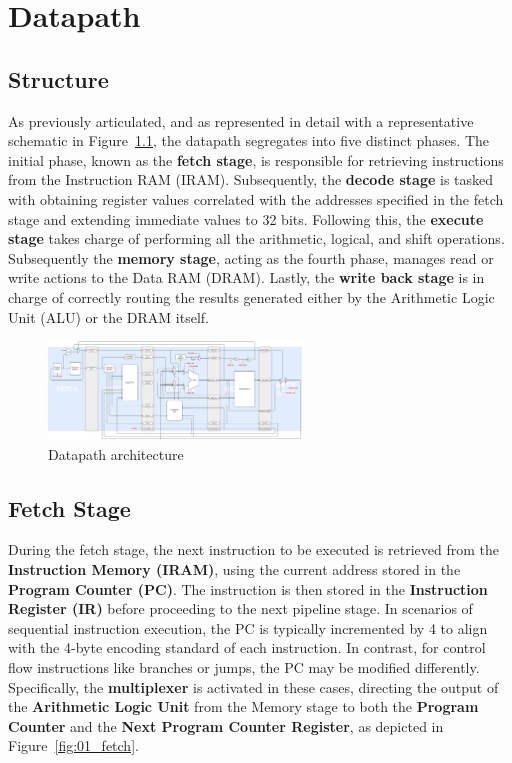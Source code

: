 \chapter{Datapath}
\label{chap:02_datapath}

\section{Structure}
As previously articulated, and as represented in detail with a representative schematic in Figure~\ref{fig:datapath}, the datapath segregates into five distinct phases. The initial phase, known as the \textbf{fetch stage}, is responsible for retrieving instructions from the Instruction RAM (IRAM). Subsequently, the \textbf{decode stage} is tasked with obtaining register values correlated with the addresses specified in the fetch stage and extending immediate values to 32 bits. Following this, the \textbf{execute stage} takes charge of performing all the arithmetic, logical, and shift operations. Subsequently the \textbf{memory stage}, acting as the fourth phase, manages read or write actions to the Data RAM (DRAM). Lastly, the \textbf{write back stage} is in charge of correctly routing the results generated either by the Arithmetic Logic Unit (ALU) or the DRAM itself. \\

\begin{figure}[!htbp]
    \centering
    \includegraphics[angle=90,origin=c,width=0.6\textwidth]{source/figures/datapath.pdf}
    \caption{Datapath architecture}
    \label{fig:datapath}
\end{figure}


\newpage
\section{Fetch Stage}
During the fetch stage, the next instruction to be executed is retrieved from the \textbf{Instruction Memory (IRAM)}, using the current address stored in the \textbf{Program Counter (PC)}. The instruction is then stored in the \textbf{Instruction Register (IR)} before proceeding to the next pipeline stage. In scenarios of sequential instruction execution, the PC is typically incremented by 4 to align with the 4-byte encoding standard of each instruction. In contrast, for control flow instructions like branches or jumps, the PC may be modified differently. Specifically, the \textbf{multiplexer} is activated in these cases, directing the output of the \textbf{Arithmetic Logic Unit} from the Memory stage to both the \textbf{Program Counter} and the \textbf{Next Program Counter Register}, as depicted in Figure~\ref{fig:01_fetch}.

